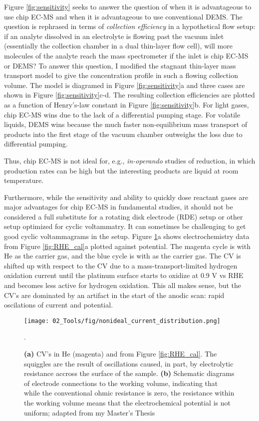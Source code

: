 Figure \ref{fig:sensitivity} seeks to answer the question of when it is advantageous to use chip EC-MS and when it is advantageous to use conventional DEMS. The question is rephrased in terms of \textit{collection efficiency} in a hypothetical flow setup: if an analyte dissolved in an electrolyte is flowing past the vacuum inlet (essentially the collection chamber in a dual thin-layer flow cell\cite{Jusys1999, Clark2015}), will more molecules of the analyte reach the mass spectrometer if the inlet is chip EC-MS or DEMS? To answer this question, I modified the stagnant thin-layer mass transport model to give the concentration profile in such a flowing collection volume\cite{Scott2016_MSc}. The model is diagramed in Figure \ref{fig:sensitivity}a and three cases are shown in Figure \ref{fig:sensitivity}c-d. The resulting collection efficiencies are plotted as a function of Henry's-law constant in Figure \ref{fig:sensitivity}b. For light gases, chip EC-MS wins due to the lack of a differential pumping stage. For volatile liquids, DEMS wins because the much faster non-equilibrium mass transport of products into the first stage of the vacuum chamber outweighs the loss due to differential pumping. 

Thus, chip EC-MS is not ideal for, e.g., \textit{in-operando} studies of  reduction, in which production rates can be high but the interesting products are liquid at room temperature.

Furthermore, while the sensitivity and ability to quickly dose reactant gases are major advantages for chip EC-MS in fundamental studies, it should not be considered a full substitute for a rotating disk electrode (RDE) setup or other setup optimized for cyclic voltammatry. It can sometimes be challenging to get good cyclic voltammagrams in the setup. Figure \ref{fig:current_distribution}a shows electrochemistry data from Figure \ref{fig:RHE_cal}a plotted against potential. The magenta cycle is with He as the carrier gas, and the blue cycle is with  as the carrier gas. The  CV is shifted up with respect to the  CV due to a mass-transport-limited hydrogen oxidation current until the platinum surface starts to oxidize at 0.9 V vs RHE and becomes less active for hydrogen oxidation. This all makes sense, but the CV's are dominated by an artifact in the start of the anodic scan: rapid oscilations of current and potential. 

\begin{figure}[h!]
	\texttt{[image: 02\_Tools/fig/nonideal\_current\_distribution.png]}
	\caption{\textbf{(a)} CV's in He (magenta) and  from Figure \ref{fig:RHE_cal}. The squiggles are the result of oscillations caused, in part, by electrolytic resistance accross the surface of the sample. \textbf{(b)} Schematic diagrams of electrode connections to the working volume, indicating that while the conventional ohmic resistance is zero, the resistance within the working volume means that the electrochemical potential is not uniform; adapted from my Master's Thesis\cite{Scott2016_MSc}}.
	\label{fig:current_distribution}
\end{figure}

